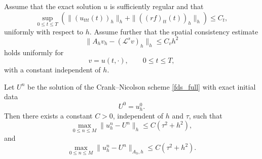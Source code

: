 \documentclass[reqno]{amsart}
\begin{document}
\begin{theorem}
\label{thm:direct-convergence}
Assume that the exact solution \(u\) is sufficiently regular and that
\begin{equation}
\sup_{0\le t\le T}
\left(
\|(u_{ttt}(t))_h\|_h
+
\|((rf)_{tt}(t))_h\|_h
\right)
\le C_t,
\label{eq:time-regularity-nodal}
\end{equation}
uniformly with respect to \(h\).
Assume further that the spatial consistency estimate
\begin{equation}
\|A_h v_h-(\mathcal L^s v)_h\|_h
\le C_v h^2
\label{eq:spatial-consistency-thm}
\end{equation}
holds uniformly for
\[
v=u(t,\cdot),\qquad 0\le t\le T,
\]
with a constant independent of \(h\).

Let \(U^n\) be the solution of the Crank--Nicolson scheme
\eqref{fds_full}
with exact initial data
\[
U^0=u_h^0.
\]
Then there exists a constant \(C>0\), independent of \(h\) and \(\tau\),
such that
\begin{equation}
\max_{0\le n\le M}
\|u_h^n-U^n\|_h
\le
C(\tau^2+h^2),
\label{eq:L2-direct-convergence}
\end{equation}
and
\begin{equation}
\max_{0\le n\le M}
\|u_h^n-U^n\|_{A_h,h}
\le
C(\tau^2+h^2).
\label{eq:energy-direct-convergence}
\end{equation}
\end{theorem}
\end{document}
